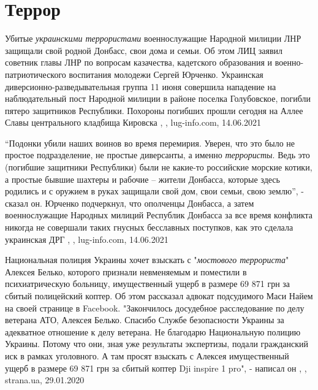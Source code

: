  
 
 
 
 
\chapter{Террор}
\label{sec:slova.terror}

Убитые \emph{украинскими террористами} военнослужащие Народной милиции ЛНР защищали
свой родной Донбасс, свои дома и семьи. Об этом ЛИЦ заявил советник главы ЛНР
по вопросам казачества, кадетского образования и военно-патриотического
воспитания молодежи Сергей Юрченко. Украинская диверсионно-разведывательная
группа 11 июня совершила нападение на наблюдательный пост Народной милиции в
районе поселка Голубовское, погибли пятеро защитников Республики. Похороны
погибших прошли сегодня на Аллее Славы центрального кладбища Кировска
, , lug-info.com, 14.06.2021

\enquote{Подонки убили наших воинов во время перемирия. Уверен, что это было не
простое подразделение, не простые диверсанты, а именно \emph{террористы}. Ведь
это (погибшие защитники Республики) были не какие-то российские морские котики,
а простые бывшие шахтеры и рабочие – жители Донбасса, которые здесь родились и
с оружием в руках защищали свой дом, свои семьи, свою землю}, - сказал он.
Юрченко подчеркнул, что ополченцы Донбасса, а затем военнослужащие Народных
милиций Республик Донбасса за все время конфликта никогда не совершали таких
гнусных бесславных поступков, как это сделала украинская ДРГ
, , lug-info.com, 14.06.2021


Национальная полиция Украины хочет взыскать с "\emph{мостового террориста}" Алексея
Белько, которого признали невменяемым и поместили в психиатрическую больницу,
имущественный ущерб в размере 69 871 грн за сбитый полицейский коптер.  Об этом
рассказал адвокат подсудимого Маси Найем на своей странице в Facebook.
"Закончилось досудебное расследование по делу ветерана АТО, Алексея Белько.
Спасибо Службе безопасности Украины за адекватное отношение к делу ветерана. Не
благодарю Национальную полицию Украины. Потому что они, зная уже результаты
экспертизы, подали гражданский иск в рамках уголовного. А там просят взыскать с
Алексея имущественный ущерб в размере 69 871 грн за сбитый коптер Dji inspire 1
pro", - написал он
, 
, strana.ua, 29.01.2020
